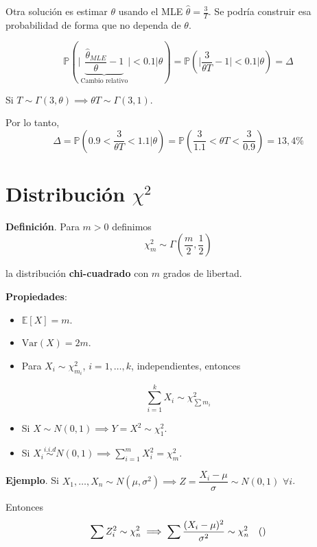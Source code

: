 \documentclass[
  12pt,
]{book}
\begin{document}
Otra solución es estimar \(\theta\) usando el MLE \(\hat{\theta} = \frac{3}{T}\). Se
podría construir esa probabilidad de forma que no dependa de \(\theta\).

\[
\mathbb P \left(\bigg| \underbrace{\dfrac{\hat\theta_{MLE}}\theta-1}_{\text{Cambio
relativo}} \bigg| < 0.1\bigg|\theta \right) = \mathbb P \left( \bigg| \dfrac{3}{\theta
T}-1 \bigg| < 0.1 \bigg| \theta \right) = \Delta \]

Si \(T\sim\Gamma(3,\theta) \implies \theta T \sim \Gamma(3,1)\).

Por lo tanto,
\[
\Delta = \mathbb P \left(0.9<\dfrac 3{\theta T}<1.1\bigg|\theta\right) = \mathbb P \left(\dfrac 3{1.1}<\theta T<\dfrac 3{0.9}\right) = 13,4\%
\]

\hypertarget{distribuciuxf3n-chi2}{%
\section{\texorpdfstring{Distribución \(\chi^2\)}{Distribución \textbackslash chi\^{}2}}\label{distribuciuxf3n-chi2}}

\textbf{Definición}. Para \(m>0\) definimos
\[
\chi^2_m \sim \Gamma\left(\dfrac m2, \dfrac 12 \right)
\]

la distribución \textbf{chi-cuadrado} con \(m\) grados de libertad.

\textbf{Propiedades}:

\begin{itemize}
\item
  \(\mathbb E[X] = m\).
\item
  \(\text{Var} (X) = 2m\).
\item
  Para \(X_i \sim \chi^2_{m_i}\), \(i = 1,\dots, k\), independientes, entonces
\end{itemize}

\[\sum_{i=1}^k X_i \sim \chi^2_{\sum m_i}\]

\begin{itemize}
\item
  Si \(X\sim N(0,1) \implies Y = X^2\sim \chi^2_1\).
\item
  Si \(X_i \stackrel{i.i.d}{\sim} N(0,1) \implies \sum_{i=1}^m X_i^2 = \chi^2_m\).
\end{itemize}

\textbf{Ejemplo}. Si \(X_1,\dots,X_n \sim N(\mu,\sigma^2) \implies Z = \dfrac{X_i-\mu}{\sigma} \sim N(0,1)\) \(\forall i\).

Entonces
\[\sum Z_i^2 \sim \chi^2_n \implies \sum \dfrac{(X_i-\mu)^2}{\sigma^2}\sim \chi^2_n \quad (\*) \]
\end{document}
